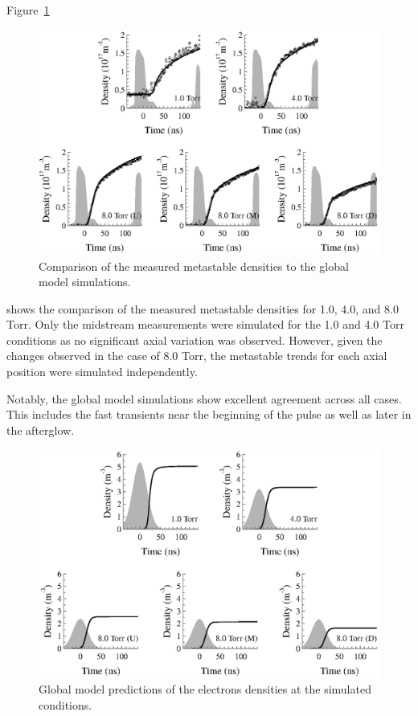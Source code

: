 Figure~\ref{fig:nmcomp}
\begin{figure}
  \centering
  \includegraphics{./chapters/modeling/figures/nmcomp.eps}
  \caption{Comparison of the measured metastable densities to the global model
  simulations.}
  \label{fig:nmcomp}
\end{figure}
shows the comparison of the measured metastable densities for 1.0, 4.0, and 8.0
Torr. Only the midstream measurements were simulated for the 1.0 and 4.0 Torr
conditions as no significant axial variation was observed. However, given the
changes observed in the case of 8.0 Torr, the metastable trends for each axial
position were simulated independently.

Notably, the global model simulations show excellent agreement across all cases.
This includes the fast transients near the beginning of the pulse as well as
later in the afterglow. 


\begin{figure}
  \centering
  \includegraphics{./chapters/modeling/figures/necomp.eps}
  \caption{Global model predictions of the electrons densities at the simulated
  conditions.}
  \label{fig:necomp}
\end{figure}



